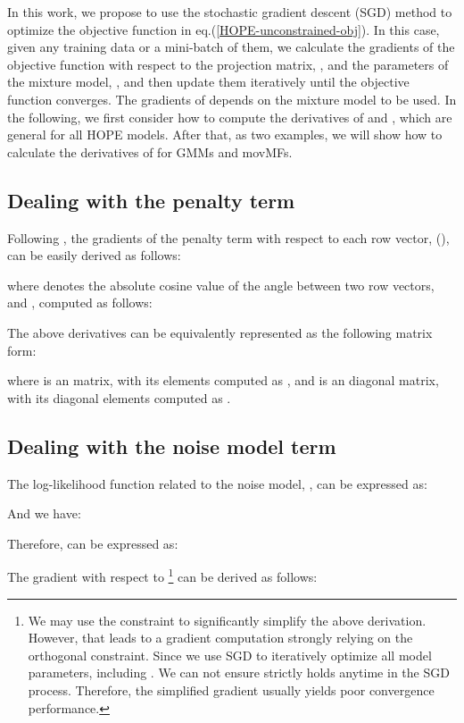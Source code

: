 \documentclass[11pt]{article}
\begin{document}
In this work, we propose to use the stochastic gradient descent (SGD) method to optimize the objective function in eq.(\ref{HOPE-unconstrained-obj}). In this case, given any training data or a mini-batch of them, we calculate the gradients of the objective function with respect to the projection matrix, , and the parameters of the mixture model, , and then update them iteratively until the objective function converges. The gradients of  depends on the mixture model to be used. In the following, we first consider how to compute the derivatives of  and , which are general for all HOPE models. After that, as two examples, we will show how to calculate the derivatives of  for GMMs and movMFs. 

\subsection{Dealing with the penalty term }

Following \cite{Bao2013}, the gradients of the penalty term  with respect to each row vector,  (), can be easily derived as follows:

where  denotes the absolute cosine value of the angle between two row vectors,  and  , computed as follows:


The above derivatives can be equivalently represented as the following matrix form:

where   is an   matrix, with its elements computed as 
 ,
and  is an  diagonal matrix, with its diagonal elements computed as 
.
 
\subsection{Dealing with the noise model term }

The log-likelihood function related to the noise model, ,
can be expressed as:


And we have:


Therefore,  can be expressed as:


The gradient with respect to  \footnote{We may use the constraint  to significantly simplify the above derivation. However, that leads to a gradient computation strongly relying on the orthogonal constraint. Since we use SGD to iteratively optimize all model parameters, including  . We can not ensure  strictly holds anytime in the SGD process. Therefore, the simplified gradient usually yields poor convergence performance. }
can be derived as follows:
\end{document}
